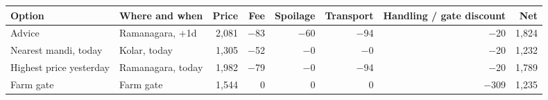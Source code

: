 \renewcommand{\arraystretch}{1.25}
\footnotesize
\begin{tabular}{|l|l|r|r|r|r|r|r|}
\hline
\textbf{Option} & \textbf{Where and when} & \textbf{Price} & \textbf{Fee} & \textbf{Spoilage} & \textbf{Transport} & \textbf{Handling / gate discount} & \textbf{Net} \\
\hline
Advice & Ramanagara, +1d & 2,081 & $-$83 & $-$60 & $-$94 & $-$20 & 1,824 \\
\hline
Nearest mandi, today & Kolar, today & 1,305 & $-$52 & $-$0 & $-$0 & $-$20 & 1,232 \\
\hline
Highest price yesterday & Ramanagara, today & 1,982 & $-$79 & $-$0 & $-$94 & $-$20 & 1,789 \\
\hline
Farm gate & Farm gate & 1,544 & 0 & 0 & 0 & $-$309 & 1,235 \\
\hline
\end{tabular}

